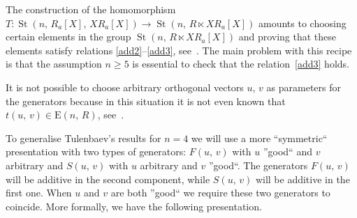 \documentclass[11pt]{amsart}
\theoremstyle{plain} \declaretheorem[name=Theorem, Refname={Theorem,Theorems}]{tm} \Crefname{tm}{Theorem}{Theorems}
\numberwithin{equation}{section}
\theoremstyle{definition} \newtheorem{df}[lm]{Definition} \Crefname{df}{Definition}{Definitions}
\theoremstyle{remark} \newtheorem{rk}[lm]{Remark} \Crefname{rk}{Remark}{Remarks}
\newcommand{\E}{{\mathrm{E}}}
\newcommand{\St}{\mathop{\mathrm{St}}\nolimits}
\begin{document}
The construction of the homomorphism $T\colon\St(n,\,R_a[X],\,XR_a[X])\rightarrow\St(n,\,R\ltimes XR_a[X])$
amounts to choosing certain elements in the group $\St(n,\,R\ltimes XR_a[X])$ and proving that these elements satisfy relations \eqref{add2}--\eqref{add3}, see~\cite[Lemmas~1.2 and~1.3\,c)]{Tul}.
The main problem with this recipe is that the assumption $n\geq5$ is essential to check that the relation~\eqref{add3} holds.

It is not possible to choose arbitrary orthogonal vectors $u$, $v$ as parameters for the generators because in this situation it is not even known that $t(u,\,v)\in\E(n,\,R)$, see~\cite{Rao}. 

To generalise Tulenbaev's results for $n=4$ we will use a more ``symmetric`` presentation with two types of generators: 
$F(u,\,v)$ with $u$ ''good`` and $v$ arbitrary and $S(u,\,v)$ with $u$ arbitrary and $v$ ''good``.
The generators $F(u,\,v)$ will be additive in the second component, while $S(u,\,v)$ will be additive in the first one.
When $u$ and $v$ are both ''good`` we require these two generators to coincide.
More formally, we have the following presentation.
\end{document}
